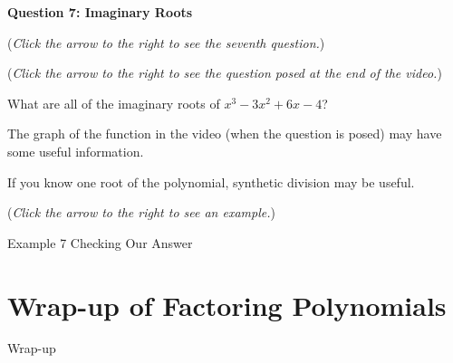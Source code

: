 \documentclass{ximera}
\begin{document}
\textbf{Question 7: Imaginary Roots}
\begin{question}
\begin{flushright}
{\color{blue}(\emph{Click the arrow to the right to see the seventh question.})}
\end{flushright}
\begin{center}
\begin{expandable}
{\color{blue}(\emph{Click the arrow to the right to see the  question
posed at the end of the video.})}
\begin{expandable}
What are all of the imaginary roots of $x^3 - 3x^2 + 6x - 4$?
\begin{multipleChoice}
\end{multipleChoice}
\begin{hint}
The graph of the function in the video (when the question is posed)
may have some useful information.
\end{hint}

\begin{hint}
If you know one root of the polynomial, synthetic division may be useful.
\end{hint}
\begin{flushright}
{\color{blue}(\emph{Click the arrow to the right to see an example.})}
\end{flushright}
\begin{expandable}
Example 7
Checking Our Answer %
\end{expandable}
\end{expandable}
\end{expandable}
\end{center}
\end{question}


\section{Wrap-up of Factoring Polynomials}

\begin{expandable}
Wrap-up
\end{expandable}
\end{document}

